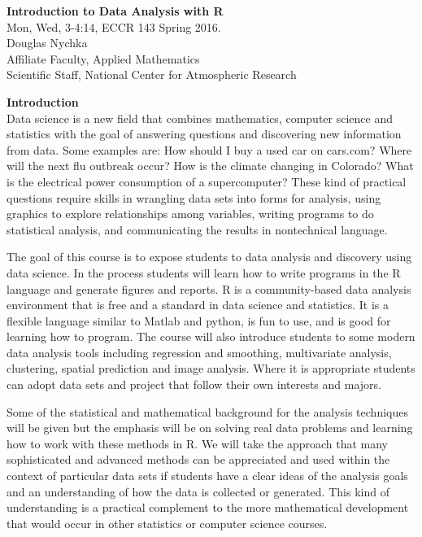 \documentclass[12pt]{article}
\begin{document}
{\Large \bf 
Introduction to Data Analysis with R}
\\
Mon, Wed, 3-4:14, ECCR 143 Spring 2016. \\
 Douglas Nychka \\
Affiliate Faculty, Applied Mathematics  \\
Scientific Staff, National Center for Atmospheric Research 

{\bf Introduction} \\
Data science is a new field that combines mathematics, computer science and statistics with the goal of
answering questions and discovering new information from data.  
Some examples are: How should I buy  a used car on cars.com? Where will the next flu outbreak occur?
How is the climate changing in Colorado? What is the electrical power consumption of a supercomputer?
These kind of practical questions require skills in wrangling data sets into forms for analysis, using graphics to explore
relationships among variables, writing programs to do statistical analysis, 
and communicating the results in nontechnical language.

 The goal of this course is to expose students to data analysis and discovery using data science. In the process students will learn how to 
 write programs in the R language and generate figures and reports. R is a community-based data analysis environment that is  free and  a standard in data science and statistics. It is a flexible language similar to Matlab and python, is fun to use, and is
 good for learning how to program.
 The course will  also introduce students to some modern data analysis tools including 
regression and smoothing, multivariate analysis, clustering, spatial prediction and image analysis.
 Where it is appropriate students can adopt data sets and project that follow their own interests and majors. 

Some of the statistical  and mathematical background
for the analysis techniques will be given but the emphasis will be on solving real data  problems and learning how to work with these methods in R.  We will take the approach that many sophisticated and advanced methods can be appreciated and 
used within the context of particular data sets if students have a clear ideas of the analysis goals and an understanding of
how the data is collected or generated. This kind of understanding is a practical complement to the more mathematical development that would occur in other statistics or computer science courses. 
\end{document}
